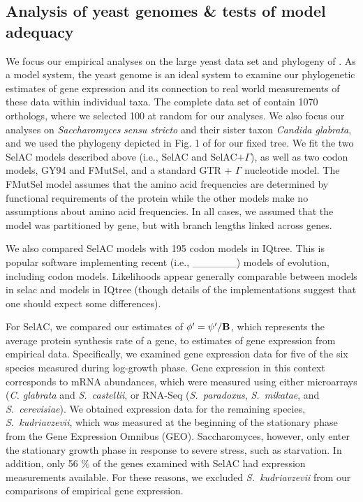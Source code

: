 \documentclass[onecolumn,letterpaper,fleqn,nogrid]{myMBE}%
\newcommand{\Func}{\ensuremath{\text{\textbf{B}}}\xspace}
\newcommand{\selac}{SelAC\xspace}
\newcommand{\selacplusgamma}{SelAC$+\Gamma$\xspace}
\newcommand{\phiprime}{\ensuremath{\phi'}\xspace}
\newcommand{\psiprime}{\ensuremath{\psi'}\xspace}
\begin{document}
\subsection{Analysis of yeast genomes \& tests of model adequacy} \label{sec:analysis}
We focus our empirical analyses on the large yeast data set and phylogeny of \citet{SalichosAndRokas2013}.
As a model system, the yeast genome is an ideal system to examine our phylogenetic estimates of gene expression and its connection to real world measurements of these data within individual taxa.
The complete data set of \citet{SalichosAndRokas2013} contain 1070 orthologs, where we selected 100 at random for our analyses.
We also focus our analyses on \emph{Saccharomyces} \emph{sensu stricto} and their sister taxon \emph{Candida glabrata}, and we used the phylogeny depicted in Fig. 1 of \citet{SalichosAndRokas2013} for our fixed tree.
We fit the two \selac models described above (i.e., \selac and \selacplusgamma), as well as two codon models, GY94 and FMutSel, and a standard GTR + $\Gamma$ nucleotide model.
The FMutSel model assumes that the amino acid frequencies are determined by functional requirements of the protein while the other models make no assumptions about amino acid frequencies.
In all cases, we assumed that the model was partitioned by gene, but with branch lengths linked across genes.

We also compared \selac models with 195 codon models in IQtree. %
This is popular software implementing recent (i.e., \_\_\_\_\_\_) models of evolution, including codon models. %
Likelihoods appear generally comparable between models in selac and models in IQtree (though details of the implementations suggest that one should expect some differences).

For \selac, we compared our estimates of $\phiprime = \psiprime/\Func$, which represents the average protein synthesis rate of a gene, to estimates of gene expression from empirical data.
Specifically, we examined gene expression data for five of the six species measured during log-growth phase.
Gene expression in this context corresponds to mRNA abundances, which were measured using either microarrays (\emph{C. glabrata} and \emph{S.~castellii}, or RNA-Seq (\emph{S.~paradoxus}, \emph{S.~mikatae}, and \emph{S.~cerevisiae}).
We obtained expression data for the remaining species, \emph{S.~kudriavzevii}, which was measured at the beginning of the stationary phase from the Gene Expression Omnibus (GEO).
Saccharomyces, however, only enter the stationary growth phase in response to severe stress, such as starvation.
In addition, only 56 \% of the genes examined with SelAC had expression measurements available.
For these reasons, we excluded \emph{S.~kudriavzevii} from our comparisons of empirical gene expression.
\end{document}
